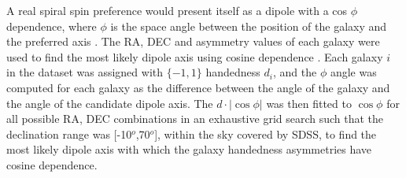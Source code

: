 \documentclass[times,twocolumn]{article}
\begin{document}








A real spiral spin preference would present itself as a dipole with a cos $\phi$  dependence, where $\phi$  is the space angle between the position of the galaxy and the preferred axis \citep{Lon11}. The RA, DEC and asymmetry values of each galaxy were used to find the most likely dipole axis using cosine dependence \citep{Lon11}. Each galaxy $i$ in the dataset was assigned with $\{-1,1\}$ handedness $d_i$, and the $\phi$ angle was computed for each galaxy as the difference between the angle of the galaxy and the angle of the candidate dipole axis. The $d\cdot|\cos \phi|$ was then fitted to $\cos \phi$ for all possible RA, DEC combinations in an exhaustive grid search such that the declination range was [-10$^o$,70$^o$], within the sky covered by SDSS, to find the most likely dipole axis with which the galaxy handedness asymmetries have cosine dependence.
\end{document}
